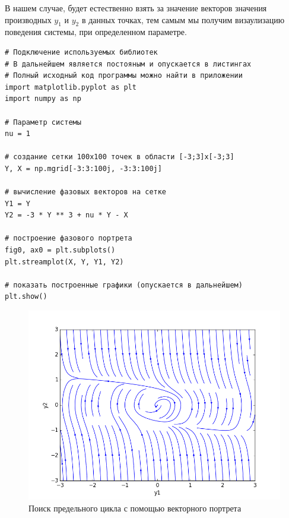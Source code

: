 В нашем случае, будет естественно взять за значение векторов значения
производных $y_1$ и $y_2$ в данных точках, тем самым мы получим визаулизацию
поведения системы, при определенном параметре. 

\clearpage

\begin{program}
  \caption{Построение фазового портрета}
  \label{lab1:prog:1}
  \begin{verbatim}
# Подключение используемых библиотек
# В дальнейшем является постояным и опускается в листингах
# Полный исходный код программы можно найти в приложении 
import matplotlib.pyplot as plt
import numpy as np

# Параметр системы
nu = 1

# создание сетки 100х100 точек в области [-3;3]x[-3;3]
Y, X = np.mgrid[-3:3:100j, -3:3:100j]

# вычисление фазовых векторов на сетке
Y1 = Y
Y2 = -3 * Y ** 3 + nu * Y - X

# построение фазового портрета
fig0, ax0 = plt.subplots()
plt.streamplot(X, Y, Y1, Y2)

# показать построенные графики (опускается в дальнейшем)
plt.show()    
  \end{verbatim}
\end{program}

\clearpage

\begin{figure}[thp]
  \centering
  \includegraphics[width=\textwidth]{figures/1_streamplot}
  \caption{Поиск предельного цикла с помощью векторного портрета}
  \label{lab1:streamplot}
\end{figure}

